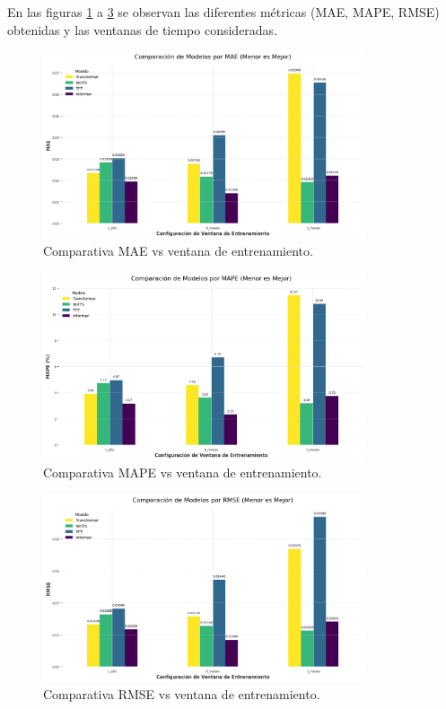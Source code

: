 \documentclass[12pt]{article}
\begin{document}
En las figuras \ref{mae} a \ref{rmse} se observan las diferentes métricas (MAE, MAPE, RMSE) obtenidas y las ventanas de tiempo consideradas.

\begin{figure}[H] 
\centering
\includegraphics[width=0.85\textwidth]{./results/comparacion_modelos_por_MAE.png} 
\caption{Comparativa MAE vs ventana de entrenamiento.}
\label{mae}
\end{figure}

\begin{figure}[H] 
\centering
\includegraphics[width=0.85\textwidth]{./results/comparacion_modelos_por_MAPE.png} 
\caption{Comparativa MAPE vs ventana de entrenamiento.}
\label{mape}
\end{figure}

\begin{figure}[H] 
\centering
\includegraphics[width=0.85\textwidth]{./results/comparacion_modelos_por_RMSE.png} 
\caption{Comparativa RMSE vs ventana de entrenamiento.}
\label{rmse}
\end{figure}
\end{document}
